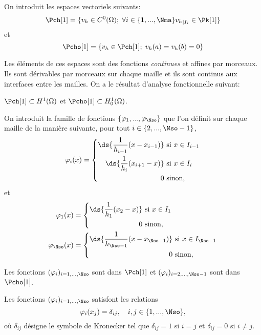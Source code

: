 On introduit les espaces vectoriels suivants:
\begin{equation}
  \label{eq:7}
  \Pch[1] = \{ v_h \in C^0(\Omega);\; \forall i \in \{ 1,...,\Nma\} {v_h}_{|I_i} \in \Pk[1]  \}
\end{equation}
et
\begin{equation}
  \label{eq:8}
  \Pcho[1] = \{ v_h \in \Pch[1];\; v_h(a)=v_h(b)=0 \}
\end{equation}

Les éléments de ces espaces sont des fonctions \emph{continues} et affines par
morceaux. Ils sont dérivables par morceaux sur chaque maille et ils sont
continus aux interfaces entre les mailles.
On a le résultat d'analyse fonctionnelle suivant:
\begin{theorem}
  \label{thr:3}
  $\Pch[1] \subset H^1(\Omega)$ et $\Pcho[1] \subset H^1_0(\Omega)$.
\end{theorem}

On introduit la famille de fonctions $\{\varphi_1,...,\varphi_\Nso\}$ que l'on
définit sur chaque maille de la manière suivante, pour tout $i  \in
\{2,...,\Nso-1\}$,
\begin{equation}
  \label{eq:18}
  \varphi_i(x) = \left\{
    \begin{split}
      \ds{\frac{1}{h_{i-1}} (x-x_{i-1})} & \mbox{ si } x \in I_{i-1}\\
      \ds{\frac{1}{h_{i}} (x_{i+1}-x)} & \mbox{ si } x \in I_{i}\\
      0 & \mbox{ sinon},
    \end{split}
  \right.
\end{equation}
et
\begin{equation}
  \label{eq:19}
  \begin{split}
  \varphi_1(x) &= \left\{
    \begin{split}
      \ds{\frac{1}{h_{1}} (x_2-x)} & \mbox{ si } x \in I_{1}\\
      0 & \mbox{ sinon},
    \end{split}
  \right.\\
  \varphi_\Nso(x) &= \left\{
    \begin{split}
      \ds{\frac{1}{h_{\Nso-1}} (x-x_{\Nso-1})} & \mbox{ si } x \in I_{\Nso-1}\\
      0 & \mbox{ sinon},
    \end{split}
  \right.
  \end{split}
\end{equation}

\begin{remark}
  \label{rem:6}
  Les fonctions $(\varphi_i)_{i=1,...,\Nso}$ sont dans $\Pch[1]$ et
  $(\varphi_i)_{i=2,...,\Nso-1}$ sont dans $\Pcho[1]$.
\end{remark}
\begin{remark}
  \label{rem:7}
  Les fonctions $(\varphi_i)_{i=1,...,\Nso}$ satisfont les relations
  \begin{equation}
    \label{eq:20}
    \varphi_i(x_j) = \delta_{ij},\quad i,j \in \{1,...,\Nso\},
  \end{equation}
  où $\delta_{ij}$ désigne le symbole de Kronecker tel que $\delta_{ij} = 1$
  si $i=j$ et $\delta_{ij}=0$ si $i \neq j$.
\end{remark}

